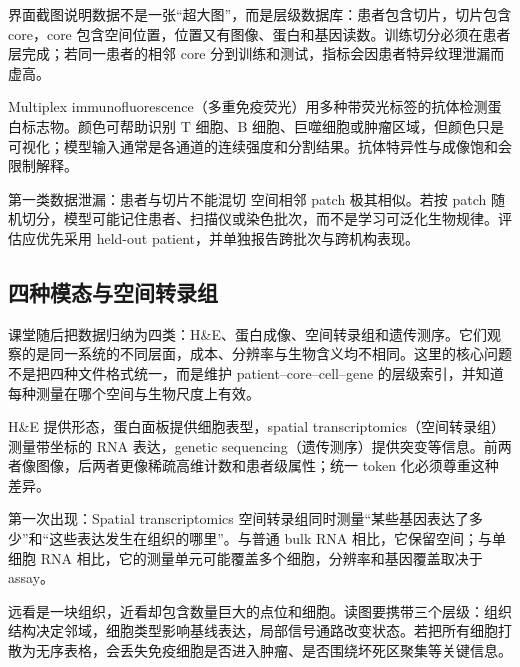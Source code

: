 界面截图说明数据不是一张“超大图”，而是层级数据库：患者包含切片，切片包含 core，core 包含空间位置，位置又有图像、蛋白和基因读数。训练切分必须在患者层完成；若同一患者的相邻 core 分到训练和测试，指标会因患者特异纹理泄漏而虚高。


Multiplex immunofluorescence（多重免疫荧光）用多种带荧光标签的抗体检测蛋白标志物。颜色可帮助识别 T 细胞、B 细胞、巨噬细胞或肿瘤区域，但颜色只是可视化；模型输入通常是各通道的连续强度和分割结果。抗体特异性与成像饱和会限制解释。

\begin{warningbox}{第一类数据泄漏：患者与切片不能混切}
空间相邻 patch 极其相似。若按 patch 随机切分，模型可能记住患者、扫描仪或染色批次，而不是学习可泛化生物规律。评估应优先采用 held-out patient，并单独报告跨批次与跨机构表现。
\end{warningbox}

\subsection{四种模态与空间转录组}

课堂随后把数据归纳为四类：H\&E、蛋白成像、空间转录组和遗传测序。它们观察的是同一系统的不同层面，成本、分辨率与生物含义均不相同。这里的核心问题不是把四种文件格式统一，而是维护 patient--core--cell--gene 的层级索引，并知道每种测量在哪个空间与生物尺度上有效。


H\&E 提供形态，蛋白面板提供细胞表型，spatial transcriptomics（空间转录组）测量带坐标的 RNA 表达，genetic sequencing（遗传测序）提供突变等信息。前两者像图像，后两者更像稀疏高维计数和患者级属性；统一 token 化必须尊重这种差异。

\begin{knowledgebox}{第一次出现：Spatial transcriptomics}
空间转录组同时测量“某些基因表达了多少”和“这些表达发生在组织的哪里”。与普通 bulk RNA 相比，它保留空间；与单细胞 RNA 相比，它的测量单元可能覆盖多个细胞，分辨率和基因覆盖取决于 assay。
\end{knowledgebox}


远看是一块组织，近看却包含数量巨大的点位和细胞。读图要携带三个层级：组织结构决定邻域，细胞类型影响基线表达，局部信号通路改变状态。若把所有细胞打散为无序表格，会丢失免疫细胞是否进入肿瘤、是否围绕坏死区聚集等关键信息。


